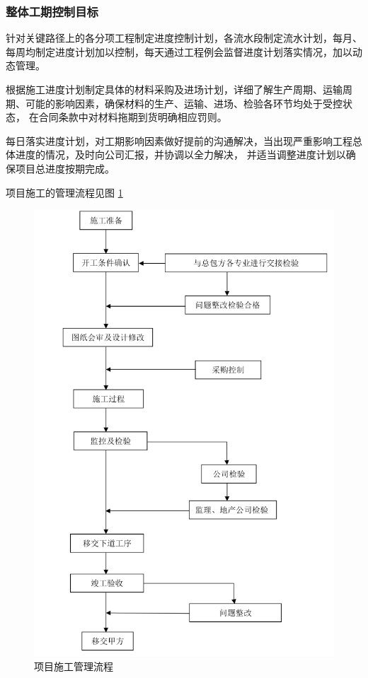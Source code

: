 \subsubsection{整体工期控制目标}

针对关键路径上的各分项工程制定进度控制计划，各流水段制定流水计划，每月、每周均制定进度计划加以控制，每天通过工程例会监督进度计划落实情况，加以动态管理。 

根据施工进度计划制定具体的材料采购及进场计划，详细了解生产周期、运输周期、可能的影响因素，确保材料的生产、运输、进场、检验各环节均处于受控状态，
在合同条款中对材料拖期到货明确相应罚则。

每日落实进度计划，对工期影响因素做好提前的沟通解决，当出现严重影响工程总体进度的情况，及时向公司汇报，并协调以全力解决，
并适当调整进度计划以确保项目总进度按期完成。

项目施工的管理流程见图 \ref{fig:c2f2}

\begin{figure}[thbp!]
    \centering
    \includegraphics[width=0.8\linewidth]{figure/c2f2.png}
    \caption{项目施工管理流程}
    \label{fig:c2f2}
\end{figure}

